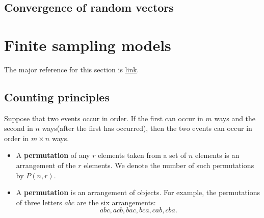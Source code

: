 \begin{refsection}
\subsection{Convergence of random vectors}
\cite[320]{hoggintroduction}






\section{Finite sampling models}

The major reference for this section is \href{http://www.math.uah.edu/stat/urn/index.html}{link}.

\subsection{Counting principles}
\begin{theorem}\label{ch:theory-of-probability:th:FundamentalCountingPrinciple}
	Suppose that two events occur in order. If the first can occur in $m$ ways and the second in $n$ ways(after the first has occurred), then the two events can occur in order in $m\times n$ ways.
\end{theorem}

\begin{definition}[permutation]
\begin{itemize}
	\item A \textbf{permutation} of any $r$ elements taken from a set of $n$ elements is an arrangement of the $r$ elements. We denote the number of such permutations by $P(n,r)$.
	\item  A \textbf{permutation} is an arrangement of objects. For example, the permutations of three letters $abc$ are the six arrangements:
	$$abc,acb,bac,bca,cab,cba.$$
\end{itemize}
\end{definition}



\end{refsection}
